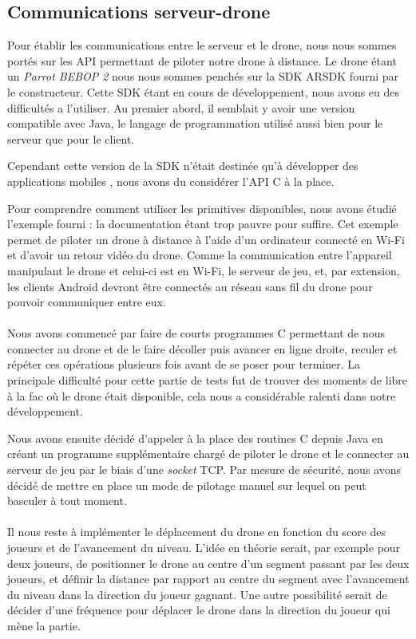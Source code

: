 \subsection{Communications serveur-drone}\label{impl}
Pour établir les communications entre le serveur et le drone, nous nous sommes portés sur les API permettant de piloter notre drone à distance. Le drone étant un \textit{Parrot BEBOP 2} nous nous sommes penchés sur la SDK ARSDK fourni par le constructeur. Cette SDK étant en cours de développement, nous avons eu des difficultés a l'utiliser. Au premier abord, il semblait y avoir une version compatible avec Java, le langage de programmation utilisé aussi bien pour le serveur que pour le client.

Cependant cette version de la SDK n'était destinée qu'à développer des applications mobiles \android{}, nous avons du considérer l'API C à la place.

Pour comprendre comment utiliser les primitives disponibles, nous avons étudié l'exemple fourni : la documentation étant trop pauvre pour suffire. Cet exemple permet de piloter un drone à distance à l'aide d'un ordinateur connecté en Wi-Fi et d'avoir un retour vidéo du drone. Comme la communication entre l'appareil manipulant le drone et celui-ci est en Wi-Fi, le serveur de jeu, et, par extension, les clients Android devront être connectés au réseau sans fil du drone  pour pouvoir communiquer entre eux.

\paragraph{}
Nous avons commencé par faire de courts programmes C permettant de nous connecter au drone et de le faire décoller puis avancer en ligne droite, reculer et répéter ces opérations plusieurs fois avant de se poser pour terminer. La principale difficulté pour cette partie de tests fut de trouver des moments de libre à la fac où le drone était disponible, cela nous a considérable ralenti dans notre développement.

Nous avons ensuite décidé d'appeler à la place des routines C depuis Java en créant un programme supplémentaire chargé de piloter le drone et le connecter au serveur de jeu par le biais d'une \textit{socket} TCP.
Par mesure de sécurité, nous avons décidé de mettre en place un mode de pilotage manuel sur lequel on peut basculer à tout moment.

\paragraph{}
Il nous reste à implémenter le déplacement du drone en fonction du score des joueurs et de l'avancement du niveau. L'idée en théorie serait, par exemple pour deux joueurs, de positionner le drone au centre d'un segment passant par les deux joueurs, et définir la distance par rapport au centre du segment avec l'avancement du niveau dans la direction du joueur gagnant.
Une autre possibilité serait de décider d'une fréquence pour déplacer le drone dans la direction du joueur qui mène la partie.

